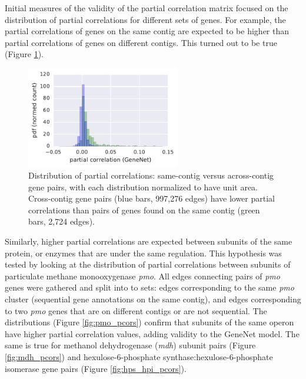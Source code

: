 Initial measures of the validity of the partial correlation matrix focused on the distribution of partial correlations for different sets of genes.
For example, the partial correlations of genes on the same contig are expected to be higher than partial correlations of genes on different contigs.
This turned out to be true (Figure \ref{fig:pcor_same_and_cross_contigs}).

\begin{figure}[H]
\centering
    \includegraphics[width=0.6\textwidth]{./tex/chapter3/figures/same-contig_and_cross-contig_pcor_distributions.pdf}
    \begin{singlespace}
    \caption[Distribution of partial correlations: same-contig versus across-contig gene pairs]{
    	Distribution of partial correlations: same-contig versus across-contig gene pairs, with each distribution normalized to have unit area.
	    Cross-contig gene pairs (blue bars, 997,276 edges) have lower partial correlations than pairs of genes found on the same contig (green bars, 2,724 edges).
        }
    \label{fig:pcor_same_and_cross_contigs}
    \end{singlespace}
\end{figure}

Similarly, higher partial correlations are expected between subunits of the same protein, or enzymes that are under the same regulation.
This hypothesis was tested by looking at the distribution of partial correlations between subunits of particulate methane monooxygenase \textit{pmo}.
All edges connecting pairs of \textit{pmo} genes were gathered and split into to sets: edges corresponding to the same \textit{pmo} cluster (sequential gene annotations on the same contig), and edges corresponding to two \textit{pmo} genes that are on different contigs or are not sequential.
The distributions (Figure \ref{fig:pmo_pcors}) confirm that subunits of the same operon have higher partial correlation values, adding validity to the GeneNet model.
The same is true for methanol dehydrogenase (\textit{mdh}) subunit pairs (Figure \ref{fig:mdh_pcors}) and hexulose-6-phosphate synthase:hexulose-6-phosphate isomerase gene pairs (Figure \ref{fig:hps_hpi_pcors}).

